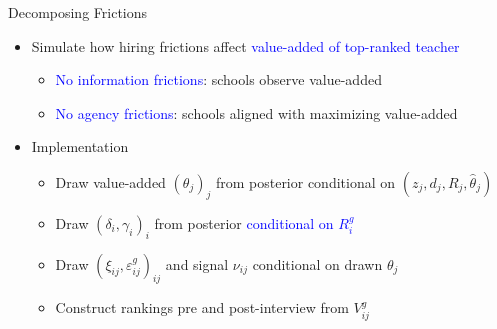 \documentclass[compress,10pt,aspectratio=169]{beamer}
\newcommand\emphblue[1]{\textcolor{blue}{#1}}
\begin{document}
\begin{frame}{Decomposing Frictions}
    \begin{itemize}
    \item Simulate how hiring frictions affect \emphblue{value-added of top-ranked teacher}
\begin{itemize}
\smallskip
    \item[$\Rightarrow$] \emphblue{No information frictions}: schools observe value-added
    \medskip
    \item[$\Rightarrow$] \emphblue{No agency frictions}: schools aligned with maximizing value-added
\end{itemize}
\bigskip
\item Implementation
\begin{itemize}
\smallskip
    \item[$\Rightarrow$] Draw value-added $(\theta_j)_j$ from posterior conditional on $(z_j,d_j,R_j,\hat{\theta}_j)$
    \medskip
    \item[$\Rightarrow$] Draw $(\delta_i,\gamma_i)_i$ from posterior \emphblue{conditional on $R_i^g$}
    \medskip
    \item[$\Rightarrow$] Draw $(\xi_{ij},\varepsilon^g_{ij})_{ij}$ and signal $\nu_{ij}$ conditional on drawn $\theta_j$
    \medskip
    \item[$\Rightarrow$] Construct rankings pre and post-interview from $V^g_{ij}$
\end{itemize}
\end{itemize}
\end{frame}
\end{document}
